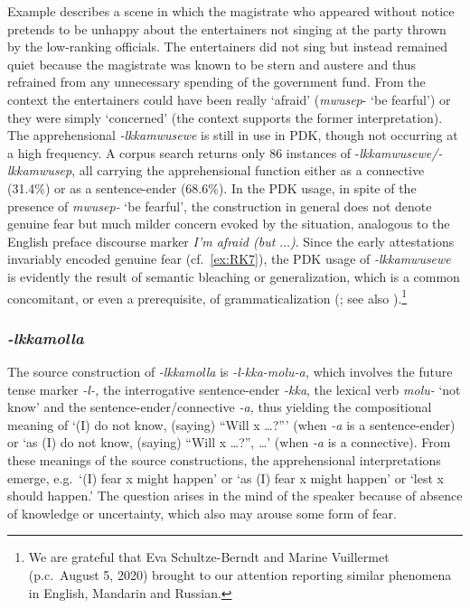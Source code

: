 \documentclass[output=paper,colorlinks,citecolor=brown]{langscibook}
\begin{document}
\noindent Example  describes a scene in which the magistrate who appeared without notice pretends to be unhappy about the entertainers not singing at the party thrown by the low-ranking officials. The entertainers did not sing but instead remained quiet because the magistrate was known to be stern and austere and thus refrained from any unnecessary spending of the government fund. From the context the entertainers could have been really `afraid' (\textit{mwusep}- `be fearful') or they were simply `concerned' (the context supports the former interpretation). The apprehensional \textit{-lkkamwusewe} is still in use in PDK, though not occurring at a high frequency. A corpus search returns only 86 instances of  \nobreakdash-\textit{lkkamwusewe/-lkkamwusep}, all carrying the apprehensional function either as a connective (31.4\%) or as a sentence-ender (68.6\%). In the PDK usage, in spite of the presence of \textit{mwusep-} `be fearful', the construction in general does not denote genuine fear but much milder concern evoked by the situation, analogous to the English preface discourse marker \textit{I'm afraid \textup{(}but $\ldots$\textup{)}}. Since the early attestations invariably encoded genuine fear (cf.\ \ref{ex:RK7}), the PDK usage of \textit{-lkkamwusewe} is evidently the result of semantic bleaching or generalization, which is a common concomitant, or even a prerequisite, of grammaticalization (\citealt{BybeePagliuca1985,bybeeetal1994}; see also ).\footnote{We are grateful that Eva Schultze-Berndt and Marine Vuillermet (p.c.\  August 5, 2020) brought to our attention \citet{Jing-SchmidtKapatsinski2012} reporting similar phenomena in English, Mandarin and Russian.}  



\subsubsection{\textit{-lkkamolla}} 
The source construction of \textit{-lkkamolla} is \textit{-l-kka-molu-a,} which involves the future tense marker \textit{-l-,} the interrogative sentence-ender \textit{-kka}, the lexical verb \textit{molu-} `not know' and the sentence-ender/connective \textit{-a,} thus yielding the compositional meaning of `(I) do not know, (saying) ``Will x …?''' (when \textit{-a} is a sentence-ender) or `as (I) do not know, (saying) ``Will x …?'',  …' (when \textit{-a} is a connective). From these meanings of the source constructions, the apprehensional interpretations emerge, e.g.\  `(I) fear x might happen' or `as (I) fear x might happen' or `lest x should happen.' The question arises in the mind of the speaker because of absence of knowledge or uncertainty, which also may arouse some form of fear.
\end{document}
